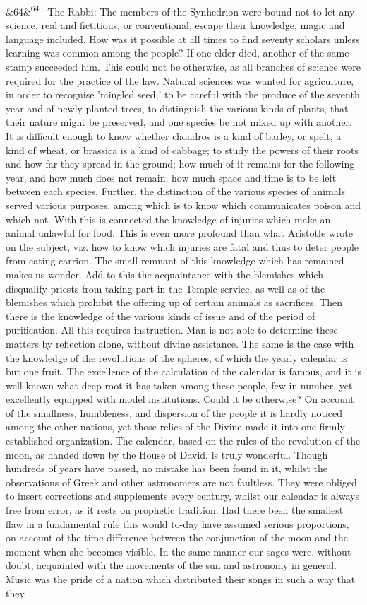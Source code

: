 \documentclass[12pt]{article}
\newcommand{\para}[1][]{\par\noindent\ifx&#1&\else\textsuperscript{\footnotesize #1}~\fi}
\begin{document}
\para[64] The Rabbi: The members of the Synhedrion were bound not to let any science, real and fictitious, or conventional, escape their knowledge, magic and language included. How was it possible at all times to find seventy scholars unless learning was common among the people? If one elder died, another of the same stamp succeeded him. This could not be otherwise, as all branches of science were required for the practice of the law. Natural sciences was wanted for agriculture, in order to recognise 'mingled seed,' to be careful with the produce of the seventh year and of newly planted trees, to distinguish the various kinds of plants, that their nature might be preserved, and one species be not mixed up with another. It is difficult enough to know whether chondros is a kind of barley, or spelt, a kind of wheat, or brassica is a kind of cabbage; to study the powers of their roots and how far they spread in the ground; how much of it remains for the following year, and how much does not remain; how much space and time is to be left between each species. Further, the distinction of the various species of animals served various purposes, among which is to know which communicates poison and which not. With this is connected the knowledge of injuries which make an animal unlawful for food. This is even more profound than what Aristotle wrote on the subject, viz. how to know which injuries are fatal and thus to deter people from eating carrion. The small remnant of this knowledge which has remained makes us wonder. Add to this the acquaintance with the blemishes which disqualify priests from taking part in the Temple service, as well as of the blemishes which prohibit the offering up of certain animals as sacrifices. Then there is the knowledge of the various kinds of issue and of the period of purification. All this requires instruction. Man is not able to determine these matters by reflection alone, without divine assistance. The same is the case with the knowledge of the revolutions of the spheres, of which the yearly calendar is but one fruit. The excellence of the calculation of the calendar is famous, and it is well known what deep root it has taken among these people, few in number, yet excellently equipped with model institutions. Could it be otherwise? On account of the smallness, humbleness, and dispersion of the people it is hardly noticed among the other nations, yet those relics of the Divine made it into one firmly established organization. The calendar, based on the rules of the revolution of the moon, as handed down by the House of David, is truly wonderful. Though hundreds of years have passed, no mistake has been found in it, whilst the observations of Greek and other astronomers are not faultless. They were obliged to insert corrections and supplements every century, whilst our calendar is always free from error, as it rests on prophetic tradition. Had there been the smallest flaw in a fundamental rule this would to-day have assumed serious proportions, on account of the time difference between the conjunction of the moon and the moment when she becomes visible. In the same manner our sages were, without doubt, acquainted with the movements of the sun and astronomy in general. Music was the pride of a nation which distributed their songs in such a way that they 
\end{document}

